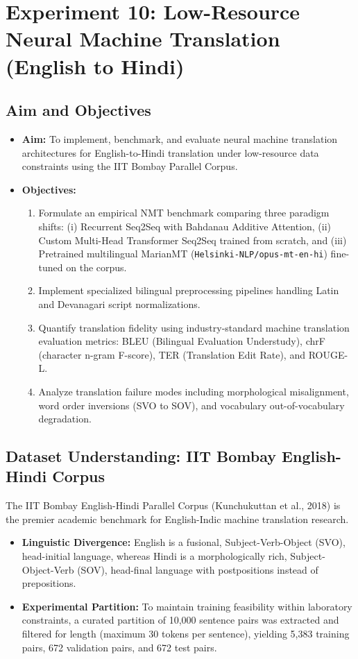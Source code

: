 \section{Experiment 10: Low-Resource Neural Machine Translation (English to Hindi)}

\subsection{Aim and Objectives}
\begin{itemize}
    \item \textbf{Aim:} To implement, benchmark, and evaluate neural machine translation architectures for English-to-Hindi translation under low-resource data constraints using the IIT Bombay Parallel Corpus.
    \item \textbf{Objectives:}
    \begin{enumerate}
        \item Formulate an empirical NMT benchmark comparing three paradigm shifts: (i) Recurrent Seq2Seq with Bahdanau Additive Attention, (ii) Custom Multi-Head Transformer Seq2Seq trained from scratch, and (iii) Pretrained multilingual MarianMT (\texttt{Helsinki-NLP/opus-mt-en-hi}) fine-tuned on the corpus.
        \item Implement specialized bilingual preprocessing pipelines handling Latin and Devanagari script normalizations.
        \item Quantify translation fidelity using industry-standard machine translation evaluation metrics: BLEU (Bilingual Evaluation Understudy), chrF (character n-gram F-score), TER (Translation Edit Rate), and ROUGE-L.
        \item Analyze translation failure modes including morphological misalignment, word order inversions (SVO to SOV), and vocabulary out-of-vocabulary degradation.
    \end{enumerate}
\end{itemize}

\subsection{Dataset Understanding: IIT Bombay English-Hindi Corpus}
The IIT Bombay English-Hindi Parallel Corpus (Kunchukuttan et al., 2018) is the premier academic benchmark for English-Indic machine translation research. 
\begin{itemize}
    \item \textbf{Linguistic Divergence:} English is a fusional, Subject-Verb-Object (SVO), head-initial language, whereas Hindi is a morphologically rich, Subject-Object-Verb (SOV), head-final language with postpositions instead of prepositions.
    \item \textbf{Experimental Partition:} To maintain training feasibility within laboratory constraints, a curated partition of 10,000 sentence pairs was extracted and filtered for length (maximum 30 tokens per sentence), yielding 5,383 training pairs, 672 validation pairs, and 672 test pairs.
\end{itemize}

